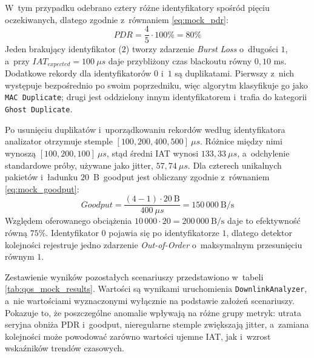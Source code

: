 W~tym przypadku odebrano cztery różne identyfikatory spośród pięciu oczekiwanych, dlatego zgodnie z~równaniem \ref{eq:mock_pdr}:
\begin{equation}
    PDR = \frac{4}{5} \cdot 100\% = 80\% \label{eq:mock_pdr} \end{equation} Jeden brakujący identyfikator ($2$) tworzy zdarzenie \textit{Burst Loss} o~długości $1$, a~przy $IAT_{expected}=100~\mu s$ daje przybliżony czas blackoutu równy $0{,}10$ ms.
Dodatkowe rekordy dla identyfikatorów $0$ i~$1$ są duplikatami.
Pierwszy z~nich występuje bezpośrednio po swoim poprzedniku, więc algorytm klasyfikuje go jako \texttt{MAC Duplicate}; drugi jest oddzielony innym identyfikatorem i~trafia do kategorii \texttt{Ghost Duplicate}.

Po usunięciu duplikatów i~uporządkowaniu rekordów według identyfikatora analizator otrzymuje stemple $[100, 200, 400, 500]~\mu s$.
Różnice między nimi wynoszą $[100, 200, 100]~\mu s$, stąd średni IAT wynosi $133{,}33~\mu s$, a~odchylenie standardowe próby, używane jako jitter, $57{,}74~\mu s$.
Dla czterech unikalnych pakietów i~ładunku $20$~B~goodput jest obliczany zgodnie z~równaniem \ref{eq:mock_goodput}:
\begin{equation}
    Goodput = \frac{(4-1) \cdot 20~\mathrm{B}}{400~\mu s} = 150\,000~\mathrm{B/s} \label{eq:mock_goodput} \end{equation} Względem oferowanego obciążenia $10\,000 \cdot 20 = 200\,000~\mathrm{B/s}$ daje to efektywność równą $75\%$.
Identyfikator $0$ pojawia się po identyfikatorze $1$, dlatego detektor kolejności rejestruje jedno zdarzenie \textit{Out-of-Order} o~maksymalnym przesunięciu równym $1$.

Zestawienie wyników pozostałych scenariuszy przedstawiono w~tabeli \ref{tab:qos_mock_results}.
Wartości są wynikami uruchomienia \texttt{DownlinkAnalyzer}, a~nie wartościami wyznaczonymi wyłącznie na podstawie założeń scenariuszy.
Pokazuje to, że poszczególne anomalie wpływają na różne grupy metryk: utrata seryjna obniża PDR i~goodput, nieregularne stemple zwiększają jitter, a~zamiana kolejności może powodować zarówno wartości ujemne IAT, jak i~wzrost wskaźników trendów czasowych.

